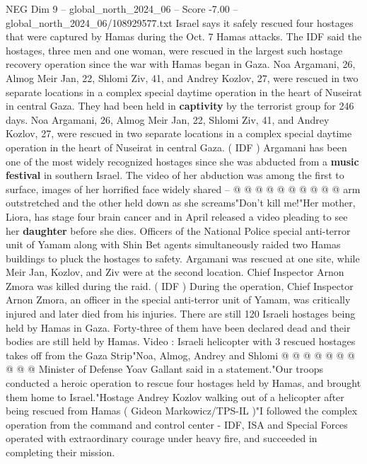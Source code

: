 \begin{textsample}{NEG Dim 9 – global\_north\_2024\_06 – Score -7.00 – global\_north\_2024\_06/108929577.txt}  \label{ex:f9_neg_167}
Israel says it safely rescued four hostages that were captured by Hamas during the Oct. 7 Hamas attacks.
The IDF said the hostages, three men and one woman, were rescued in the largest such hostage recovery operation since the war with Hamas began in Gaza.
Noa Argamani, 26, Almog Meir Jan, 22, Shlomi Ziv, 41, and Andrey Kozlov, 27, were rescued in two separate locations in a complex special daytime operation in the heart of Nuseirat in central Gaza.
They had been held in \textbf{captivity} by the terrorist group for 246 days.
Noa Argamani, 26, Almog Meir Jan, 22, Shlomi Ziv, 41, and Andrey Kozlov, 27, were rescued in two separate locations in a complex special daytime operation in the heart of Nuseirat in central Gaza. ( IDF ) Argamani has been one of the most widely recognized hostages since she was abducted from a \textbf{music} \textbf{festival} in southern Israel.
The video of her abduction was among the first to surface, images of her horrified face widely shared -- @ @ @ @ @ @ @ @ @ @ arm outstretched and the other held down as she screams"Don't kill me!"Her mother, Liora, has stage four brain cancer and in April released a video pleading to see her \textbf{daughter} before she dies.
Officers of the National Police special anti-terror unit of Yamam along with Shin Bet agents simultaneously raided two Hamas buildings to pluck the hostages to safety.
Argamani was rescued at one site, while Meir Jan, Kozlov, and Ziv were at the second location.
Chief Inspector Arnon Zmora was killed during the raid. ( IDF ) During the operation, Chief Inspector Arnon Zmora, an officer in the special anti-terror unit of Yamam, was critically injured and later died from his injuries.
There are still 120 Israeli hostages being held by Hamas in Gaza.
Forty-three of them have been declared dead and their bodies are still held by Hamas.
Video : Israeli helicopter with 3 rescued hostages takes off from the Gaza Strip"Noa, Almog, Andrey and Shlomi @ @ @ @ @ @ @ @ @ @ Minister of Defense Yoav Gallant said in a statement."Our troops conducted a heroic operation to rescue four hostages held by Hamas, and brought them home to Israel."Hostage Andrey Kozlov walking out of a helicopter after being rescued from Hamas ( Gideon Markowicz/TPS-IL )"I followed the complex operation from the command and control center - IDF, ISA and Special Forces operated with extraordinary courage under heavy fire, and succeeded in completing their mission.

\end{textsample}
